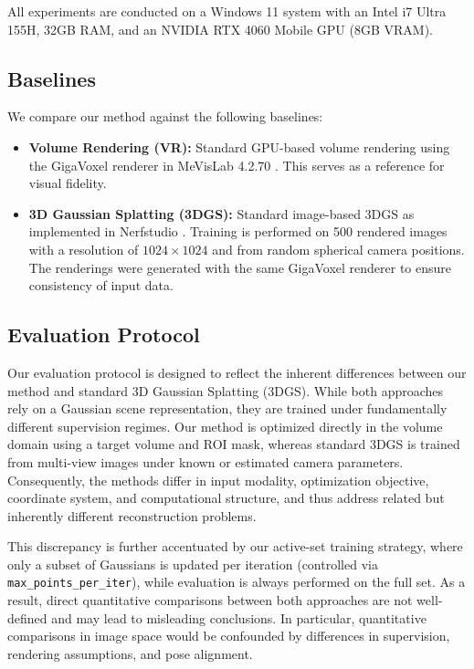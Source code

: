 \documentclass[runningheads]{llncs}
\begin{document}
All experiments are conducted on a Windows 11 system with an Intel i7 Ultra 155H, 32GB RAM, and an NVIDIA RTX 4060 Mobile GPU (8GB VRAM).

\subsection{Baselines}
We compare our method against the following baselines:

\begin{itemize}
\item \textbf{Volume Rendering (VR):} Standard GPU-based volume rendering using the GigaVoxel renderer in MeVisLab 4.2.70 \cite{mevislab}. This serves as a reference for visual fidelity.

\item \textbf{3D Gaussian Splatting (3DGS):} Standard image-based 3DGS as implemented in Nerfstudio \cite{nerfstudio}. Training is performed on 500 rendered images with a resolution of $1024 \times 1024$ and from random spherical camera positions. The renderings were generated with the same GigaVoxel renderer to ensure consistency of input data.
\end{itemize}

\subsection{Evaluation Protocol}
\label{sec:evaluation}

Our evaluation protocol is designed to reflect the inherent differences between our method and standard 3D Gaussian Splatting (3DGS). While both approaches rely on a Gaussian scene representation, they are trained under fundamentally different supervision regimes. Our method is optimized directly in the volume domain using a target volume and ROI mask, whereas standard 3DGS is trained from multi-view images under known or estimated camera parameters. Consequently, the methods differ in input modality, optimization objective, coordinate system, and computational structure, and thus address related but inherently different reconstruction problems.

This discrepancy is further accentuated by our active-set training strategy, where only a subset of Gaussians is updated per iteration (controlled via \texttt{max\_points\_per\_iter}), while evaluation is always performed on the full set. As a result, direct quantitative comparisons between both approaches are not well-defined and may lead to misleading conclusions. In particular, quantitative comparisons in image space would be confounded by differences in supervision, rendering assumptions, and pose alignment.
\end{document}
